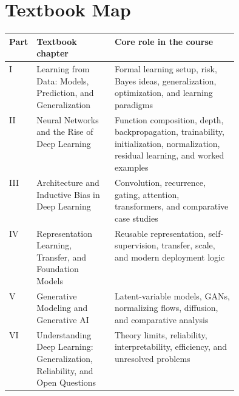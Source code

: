 \documentclass[11pt]{article}
\begin{document}
\section{Textbook Map}
\begin{center}
\begin{tabularx}{\linewidth}{>{\raggedright\arraybackslash}p{0.10\linewidth} >{\raggedright\arraybackslash}p{0.34\linewidth} X}
\toprule
\textbf{Part} & \textbf{Textbook chapter} & \textbf{Core role in the course} \\
\midrule
I & Learning from Data: Models, Prediction, and Generalization & Formal learning setup, risk, Bayes ideas, generalization, optimization, and learning paradigms \\
II & Neural Networks and the Rise of Deep Learning & Function composition, depth, backpropagation, trainability, initialization, normalization, residual learning, and worked examples \\
III & Architecture and Inductive Bias in Deep Learning & Convolution, recurrence, gating, attention, transformers, and comparative case studies \\
IV & Representation Learning, Transfer, and Foundation Models & Reusable representation, self-supervision, transfer, scale, and modern deployment logic \\
V & Generative Modeling and Generative AI & Latent-variable models, GANs, normalizing flows, diffusion, and comparative analysis \\
VI & Understanding Deep Learning: Generalization, Reliability, and Open Questions & Theory limits, reliability, interpretability, efficiency, and unresolved problems \\
\bottomrule
\end{tabularx}
\end{center}
\end{document}

